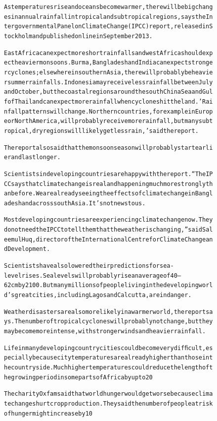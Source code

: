 \begin{figure}[t]
{{\begin{alltt}
As temperatures rise and oceans become warmer, there will be big changes in annual rainfall in tropical and subtropical regions, says the Intergovernmental Panel on Climate Change (IPCC) report, released in Stockholm and published online in September 2013. 

East Africa can expect more short rainfalls and west Africa should expect heavier monsoons. Burma, Bangladesh and India can expect stronger cyclones; elsewhere in southern Asia, there will probably be heavier summer rainfalls. Indonesia may receive less rainfall between July and October, but the coastal regions around the south China Sea and Gulf of Thailand can expect more rainfall when cyclones hit the land. 'Rainfall patterns will change. Northern countries, for example in Europe or North America, will probably receive more rainfall, but many subtropical, dry regions will likely get less rain,' said the report. 

The report also said that the monsoon season will probably start earlier and last longer. 

Scientists in developing countries are happy with the report. “The IPCC says that climate change is real and happening much more strongly than before. We are already seeing the effects of climate change in Bangladesh and across south Asia. It’s not news to us. 

Most developing countries are experiencing climate change now. They do not need the IPCC to tell them that the weather is changing,” said Saleemul Huq, director of the International Centre for Climate Change and Development. 

Scientists have also lowered their predictions for sea-level rises. Sea levels will probably rise an average of 40 –62 cm by 2100. But many millions of people living in the developing world’s great cities, including Lagos and Calcutta, are in danger. 

Weather disasters are also more likely in a warmer world, the report says. The number of tropical cyclones will probably not change, but they may become more intense, with stronger winds and heavier rainfall. 

Life in many developing country cities could become very difﬁcult, especially because city temperatures are already higher than those in the countryside. Much higher temperatures could reduce the length of the growing period in some parts of Africa by up to 20%

The charity Oxfam said that world hunger would get worse because climate changes hurt crop production. They said the number of people at risk of hunger might increase by 10%


\end{alltt}}}
\end{figure}
